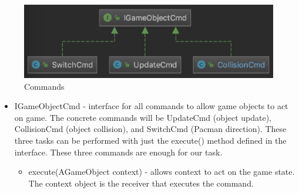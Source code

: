 \documentclass[letterpaper, 11pt]{article}
\begin{document}
\begin{figure}[htbp] 
  \centering
  \includegraphics[width=.85\linewidth]{cmd.png} 
  \caption{Commands}
  \label{figcmd} 
\end{figure}

\begin{itemize}
  \item IGameObjectCmd - interface for all commands to allow game objects to act on game. The concrete commands will be UpdateCmd (object update), CollisionCmd (object collision), and SwitchCmd (Pacman direction). These three tasks can be performed with just the execute() method defined in the interface. These three commands are enough for our task. 
  \begin{itemize}
    \item execute(AGameObject context) - allows context to act on the game state. The context object is the receiver that executes the command.
  \end{itemize}
  

  
\end{itemize}
\end{document}
